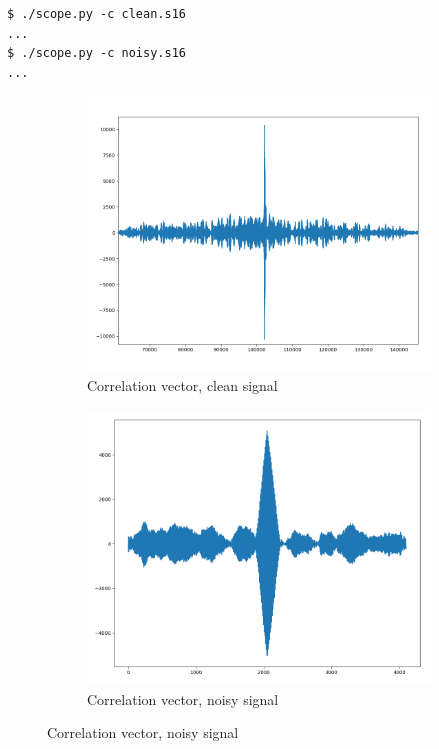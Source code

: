\documentclass[a4paper]{article}
\begin{document}
\begin{lstlisting}
$ ./scope.py -c clean.s16
...
$ ./scope.py -c noisy.s16
...
\end{lstlisting}

\begin{figure}[H]
    \centering
    \begin{subfigure}[b]{0.45\textwidth}
        \includegraphics[width=1\textwidth]{correlation_clean.png}
        \caption{\label{fig:correlation_clean}Correlation vector, clean signal}
    \end{subfigure}
    \begin{subfigure}[b]{0.45\textwidth}
        \includegraphics[width=1\textwidth]{correlation_noisy.png}
        \caption{\label{fig:correlation_noisy}Correlation vector, noisy signal}
    \end{subfigure}
\end{figure}
\end{document}

